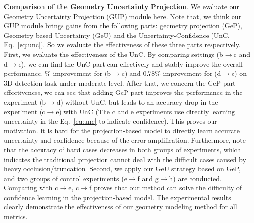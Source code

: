 \documentclass[10pt,twocolumn,letterpaper]{article}
\begin{document}
\noindent
{\bf Comparison of the Geometry Uncertainty Projection}.
We evaluate our Geometry Uncertainty Projection (GUP) module here. Note that, we think our GUP module brings gains from the following parts: geometry projection (GeP), Geometry based Uncertainty (GeU) and the Uncertainty-Confidence (UnC, Eq.~\ref{eq:unc}). So we evaluate the effectiveness of these three parts respectively. 
First, we evaluate the effectiveness of the UnC. By comparing settings (b$\rightarrow$c and d$\rightarrow$e), we can find the UnC part can effectively and stably improve the overall performance, \% improvement for (b$\rightarrow$c) and 0.78\% improvement for (d$\rightarrow$e) on 3D detection task under moderate level. After that, we concern the GeP part effectiveness, we can see that adding GeP part improves the performance in the experiment (b$\rightarrow$d) without UnC, but leads to an accuracy drop in the experiment (c$\rightarrow$e) with UnC (The c and e experiments use directly learning uncertainty in the Eq.~\ref{eq:unc} to indicate confidence).
This proves our motivation. It is hard for the projection-based model to directly learn accurate uncertainty and confidence because of the error amplification. 
Furthermore, note that the accuracy of hard cases decreases in both groups of experiments, which indicates the traditional projection cannot deal with the difficult cases caused by heavy occlusion/truncation.
Second, we apply our GeU strategy based on GeP, and two groups of control experiments (e$\rightarrow$f and g$\rightarrow$h) are conducted. Comparing with c$\rightarrow$e, c$\rightarrow$f proves that our method can solve the difficulty of confidence learning in the projection-based model. 
The experimental results clearly demonstrate the effectiveness of our geometry modeling method for all metrics.
\end{document}

